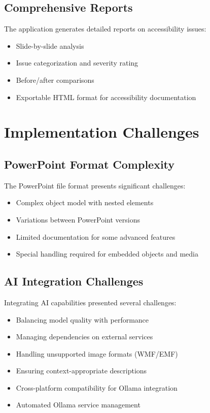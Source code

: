\documentclass{article}
\begin{document}
\subsection{Comprehensive Reports}
The application generates detailed reports on accessibility issues:
\begin{itemize}
    \item Slide-by-slide analysis
    \item Issue categorization and severity rating
    \item Before/after comparisons
    \item Exportable HTML format for accessibility documentation
\end{itemize}

\section{Implementation Challenges}

\subsection{PowerPoint Format Complexity}
The PowerPoint file format presents significant challenges:
\begin{itemize}
    \item Complex object model with nested elements
    \item Variations between PowerPoint versions
    \item Limited documentation for some advanced features
    \item Special handling required for embedded objects and media
\end{itemize}

\subsection{AI Integration Challenges}
Integrating AI capabilities presented several challenges:
\begin{itemize}
    \item Balancing model quality with performance
    \item Managing dependencies on external services
    \item Handling unsupported image formats (WMF/EMF)
    \item Ensuring context-appropriate descriptions
    \item Cross-platform compatibility for Ollama integration
    \item Automated Ollama service management
\end{itemize}
\end{document}
